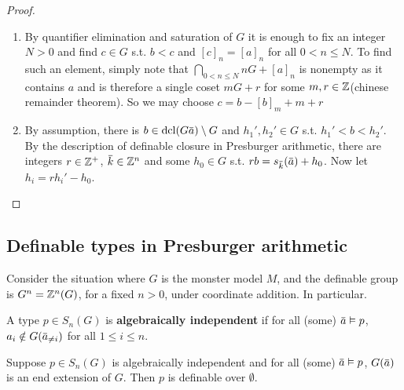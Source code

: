 \documentclass[11pt]{article}
\begin{document}
\begin{proof}
\begin{enumerate}
\item By quantifier elimination and saturation of \(G\) it is enough to fix an integer \(N>0\) and
find \(c\in G\) s.t. \(b<c\) and \([c]_n=[a]_n\) for all \(0<n\le N\). To find such an element,
simply note that \(\bigcap_{0<n\le N}nG+[a]_n\) is nonempty as it contains \(a\) and is therefore a
single coset \(mG+r\) for some \(m,r\in\mathbb{Z}\)(chinese remainder theorem). So we may
choose \(c=b-[b]_m+m+r\)
\item By assumption, there is \(b\in\dcl(G\bara)\setminus G\) and \(h_1',h_2'\in G\) s.t. \(h_1'<b<h_2'\). By the
description of definable closure in Presburger arithmetic, there are
integers \(r\in\mathbb{Z}^+\), \(\bark\in\Z^n\) and some \(h_0\in G\) s.t. \(rb=s_{\bark}(\bara)+h_0\). Now
let \(h_i=rh_i'-h_0\).
\end{enumerate}
\end{proof}
\subsection{Definable types in Presburger arithmetic}
\label{sec:org014669d}
Consider the situation where \(G\) is the monster model \(M\), and the definable group
is \(G^n=\mathbb{Z}^n(G)\), for a fixed \(n>0\), under coordinate addition. In particular.

\begin{definition}[]
A type \(p\in S_n(G)\) is \textbf{algebraically independent} if for all
(some) \(\bara\vDash p\), \(a_i\notin G(\bara_{\neq i})\) for all \(1\le i\le n\).
\end{definition}

\begin{lemma}[]
\label{0.6}
Suppose \(p\in S_n(G)\) is algebraically independent and for all (some) \(\bara\vDash p\), \(G(\bara)\)
is an end extension of \(G\). Then \(p\) is definable over \(\emptyset\).
\end{lemma}
\end{document}
